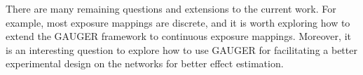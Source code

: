 \documentclass{article}
\theoremstyle{plain}
\theoremstyle{definition}
\theoremstyle{remark}
\begin{document}
There are many remaining questions and extensions to the current work. For example, most exposure mappings are discrete, and it is worth exploring how to extend the GAUGER framework to continuous exposure mappings. Moreover, it is an interesting question to explore how to use GAUGER for facilitating a better experimental design on the networks for better effect estimation. 










\end{document}
